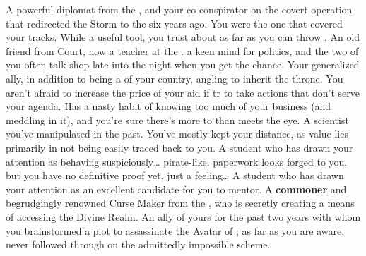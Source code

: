 \documentclass[char]{GL2020}
\begin{document}
\begin{contacts}
    \contact{\cDiplomat{}} A powerful diplomat from the \pTech{}, and your co-conspirator on the covert operation that redirected the Storm to the \pShip{} six years ago. You were the one that covered your tracks. While \cDiplomat{\theyare} a useful tool, you trust \cDiplomat{\them} about as far as you can throw \cDiplomat{\them}.
    \contact{\cHistory{}} An old friend from Court, now a teacher at the \pSc{}. \cHistory{\Theyhave} a keen mind for politics, and the two of you often talk shop late into the night when you get the chance.
    \contact{\cPrince{}} Your generalized ally, in addition to being a \cPrince{\Heir} of your country, angling to inherit the throne. You aren’t afraid to increase the price of your aid if \cPrince{\they} tr\cPrince{\verby} to take actions that don’t serve your agenda.
    \contact{\cInterpol{}} Has a nasty habit of knowing too much of your business (and meddling in it), and you're sure there's more to \cInterpol{\them} than meets the eye.
    \contact{\cHeadScientist{}} A scientist you've manipulated in the past. You've mostly kept your distance, as \cHeadScientist{\their} value lies primarily in \cHeadScientist{\them} not being easily traced back to you.
    \contact{\cPirateChild{}} A student who has drawn your attention as behaving suspiciously\ldots{} pirate-like. \cPirateChild{\Their} paperwork looks forged to you, but you have no definitive proof yet, just a feeling\ldots{}
     \contact{\cLibAssist{}} A student who has drawn your attention as an excellent candidate for you to mentor.
    \contact{\cCurse{}} A \textbf{commoner} and begrudgingly renowned Curse Maker from the \pFarm{}, who is secretly creating a means of accessing the Divine Realm.
    \contact{\cAntiChup{}} An ally of yours for the past two years with whom you brainstormed a plot to assassinate the Avatar of \cEbb{}; as far as you are aware, \cAntiChup{\they} never followed through on the admittedly impossible scheme.
\end{contacts}
\end{document}
